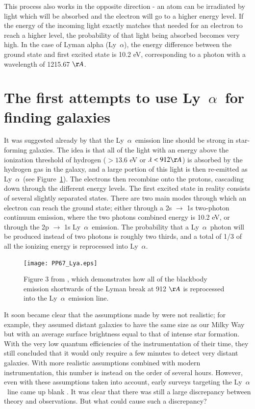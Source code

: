 \documentclass[a4wide,12pt]{book}
\newcommand{\lya}{Ly~${\alpha}$}
\begin{document}
{This process also works in the opposite direction - an atom can be irradiated by light which will be absorbed and the electron will go to a higher energy level. If the energy of the incoming light exactly matches that needed for an electron to reach a higher level, the probability of that light being absorbed becomes very high. In the case of Lyman alpha (\lya), the energy difference between the ground state and first excited state is 10.2 eV, corresponding to a photon with a wavelength of 1215.67 $\AA$. 

\section{The first attempts to use \lya\ for finding galaxies}
It was suggested already by \citet{partridge-peebles1967} that the \lya\ emission line should be strong in star-forming galaxies. The idea is that all of the light with an energy above the ionization threshold of hydrogen ($> 13.6$ eV or $\lambda < 912 \AA$) is absorbed by the hydrogen gas in the galaxy, and a large portion of this light is then re-emitted as \lya\ (see Figure~\ref{Fig:PP67}). The electrons then recombine onto the protons, cascading down through the different energy levels. The first excited state in reality consists of several slightly separated states. There are two main modes through which an electron can reach the ground state; either through a 2s $\rightarrow$ 1s two-photon continuum emission, where the two photons combined energy is 10.2 eV, or through the 2p $\rightarrow$ 1s \lya\ emission. The probability that a \lya\ photon will be produced instead of two photons is roughly two thirds, and a total of 1/3 of all the ionizing energy is reprocessed into \lya . 

\begin{figure}
   \centering
   \texttt{[image: PP67\_Lya.eps]}
   \caption{Figure 3 from \citet{partridge-peebles1967}, which demonstrates how all of the blackbody emission shortwards of the Lyman break at 912 $\AA$ is reprocessed into the \lya\ emission line.}
              \label{Fig:PP67}
    \end{figure}

It soon became clear that the assumptions made by \citet{partridge-peebles1967} were not realistic; for example, they assumed distant galaxies to have the same size as our Milky Way but with an average surface brightness equal to that of intense star formation. With the very low quantum efficiencies of the instrumentation of their time, they still concluded that it would only require a few minutes to detect very distant galaxies. With more realistic assumptions combined with modern instrumentation, this number is instead on the order of several hours. However, even with these assumptions taken into account, early surveys targeting the \lya\ line came up blank \citep{pritchet1994}. It was clear that there was still a large discrepancy between theory and observations. But what could cause such a discrepancy?


}
\end{document}
